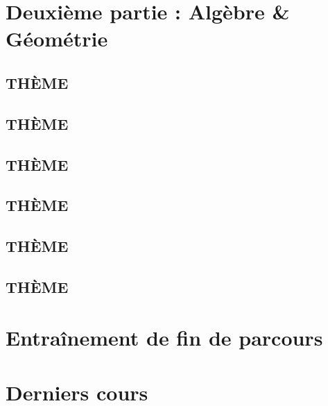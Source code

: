 \documentclass[poly,trombi]{valbonne}
\begin{document}

\section{Deuxième partie : Algèbre \& Géométrie}

\subsection{THÈME}


\subsection{THÈME}


\subsection{THÈME}


\subsection{THÈME}


\subsection{THÈME}


\subsection{THÈME}






\section{Entraînement de fin de parcours}





\section{Derniers cours}
\end{document}
